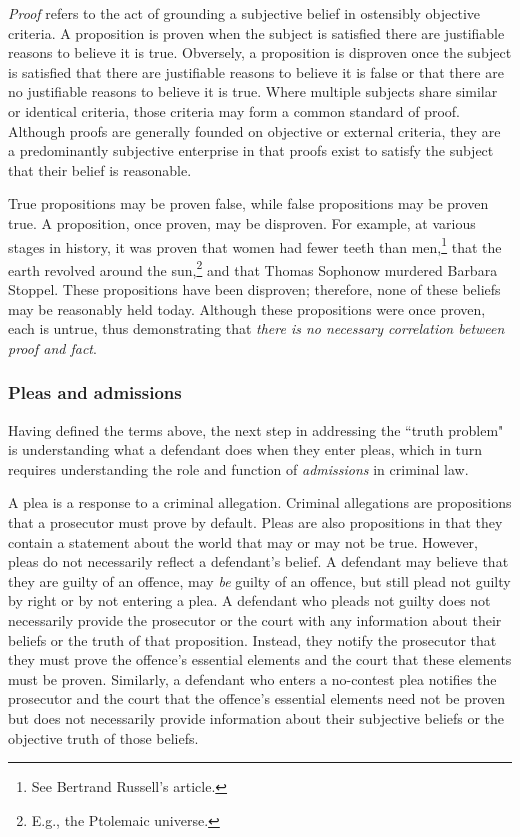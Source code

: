 \textit{Proof} refers to the act of grounding a subjective belief in ostensibly objective criteria. A proposition is proven when the subject is satisfied there are justifiable reasons to believe it is true. Obversely, a proposition is disproven once the subject is satisfied that there are justifiable reasons to believe it is false or that there are no justifiable reasons to believe it is true. Where multiple subjects share similar or identical criteria, those criteria may form a common standard of proof. Although proofs are generally founded on objective or external criteria, they are a predominantly subjective enterprise in that proofs exist to satisfy the subject that their belief is reasonable. 

True propositions may be proven false, while false propositions may be proven true. A proposition, once proven, may be disproven. For example, at various stages in history, it was proven that women had fewer teeth than men,\footnote{See Bertrand Russell's article.} that the earth revolved around the sun,\footnote{E.g., the Ptolemaic universe.} and that Thomas Sophonow murdered Barbara Stoppel. These propositions have been disproven; therefore, none of these beliefs may be reasonably held today. Although these propositions were once proven, each is untrue, thus demonstrating that \textit{there is no necessary correlation between proof and fact}.

\subsubsection{Pleas and admissions}

Having defined the terms above, the next step in addressing the ``truth problem" is understanding what a defendant does when they enter pleas, which in turn requires understanding the role and function of \textit{admissions} in criminal law. 

A plea is a response to a criminal allegation. Criminal allegations are propositions that a prosecutor must prove by default. Pleas are also propositions in that they contain a statement about the world that may or may not be true. However, pleas do not necessarily reflect a defendant's belief. A defendant may believe that they are guilty of an offence, may \textit{be} guilty of an offence, but still plead not guilty by right or by not entering a plea. A defendant who pleads not guilty does not necessarily provide the prosecutor or the court with any information about their beliefs or the truth of that proposition. Instead, they notify the prosecutor that they must prove the offence's essential elements and the court that these elements must be proven. Similarly, a defendant who enters a no-contest plea notifies the prosecutor and the court that the offence's essential elements need not be proven but does not necessarily provide information about their subjective beliefs or the objective truth of those beliefs. 

